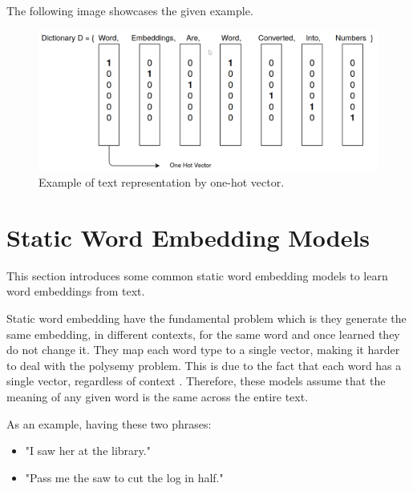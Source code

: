     \par The following image showcases the given example.
    
    
    \begin{figure}[htb]
        \centering
        \includegraphics[scale = 0.23]{Sections/3StateOfTheArt/3_images/one_hot_encoding.png}
        \caption{Example of text representation by one-hot vector.}   
    \end{figure}
    
    
    



    \section{Static Word Embedding Models}
    \label{sec:static}

    \par This section introduces some common static word embedding models to learn word embeddings from text.


    \par Static word embedding have the fundamental problem which is they generate the same embedding, in different contexts, for the same word and once learned they do not change it. They map each word type to a single vector, making it harder to deal with the polysemy problem. This is due to the fact that each word has a single vector, regardless of context \cite{Mikolov2013}. Therefore, these models assume that the meaning of any given word is the same across the entire text.
   

    \par As an example, having these two phrases:

    \begin{itemize}
        \item "I saw her at the library."
        \item "Pass me the saw to cut the log in half."
    \end{itemize}

